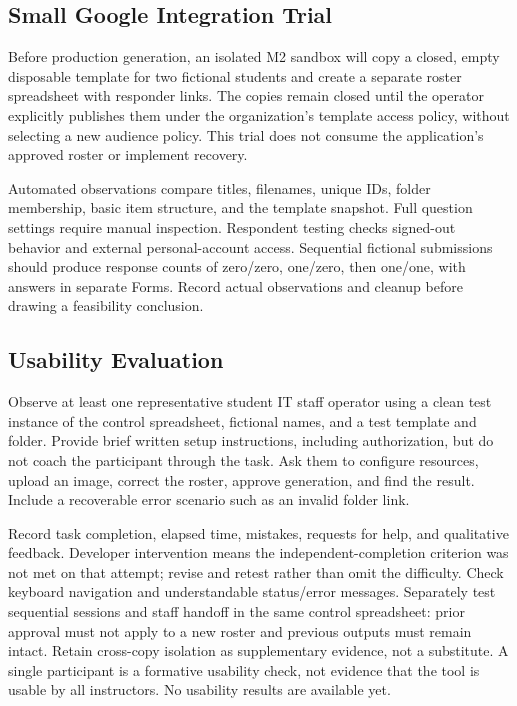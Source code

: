 \subsection{Small Google Integration Trial}
Before production generation, an isolated M2 sandbox will copy a closed,
empty disposable template for two fictional students and create a separate
roster spreadsheet with responder links. The copies remain closed until the
operator explicitly publishes them under the organization's template access
policy, without selecting a new audience policy. This trial
does not consume the application's approved roster or implement recovery.

Automated observations compare titles, filenames, unique IDs, folder membership,
basic item structure, and the template snapshot. Full question settings require
manual inspection. Respondent testing checks signed-out behavior and external
personal-account access. Sequential fictional submissions should produce response
counts of zero/zero, one/zero, then one/one, with answers in separate Forms.
Record actual observations and cleanup before drawing a feasibility conclusion.

\subsection{Usability Evaluation}
Observe at least one representative student IT staff operator using a clean test instance
of the control spreadsheet, fictional names, and a test template and folder.
Provide brief written setup instructions, including authorization, but do not
coach the participant through the task. Ask them to configure resources, upload
an image, correct the roster, approve generation, and find the result. Include a
recoverable error scenario such as an invalid folder link.

Record task completion, elapsed time, mistakes, requests for help, and qualitative
feedback. Developer intervention means the independent-completion criterion was
not met on that attempt; revise and retest rather than omit the difficulty.
Check keyboard navigation and understandable status/error messages. Separately
test sequential sessions and staff handoff in the same control spreadsheet:
prior approval must not apply to a new roster and previous outputs must remain
intact. Retain cross-copy isolation as supplementary evidence, not a substitute.
A single participant is a formative usability check, not evidence that the tool
is usable by all instructors. No usability results are available yet.

